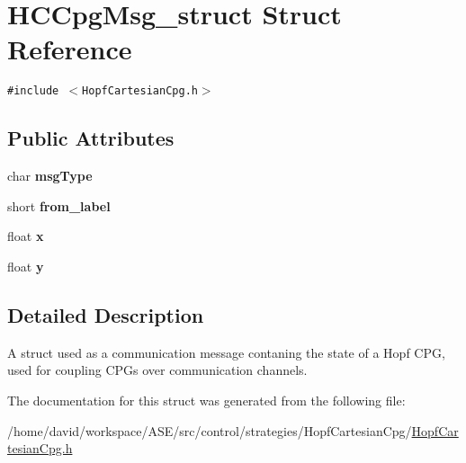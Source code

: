 \hypertarget{structHCCpgMsg__struct}{
\section{HCCpgMsg\_\-struct Struct Reference}
\label{structHCCpgMsg__struct}
}
{\tt \#include $<$HopfCartesianCpg.h$>$}

\subsection*{Public Attributes}
\begin{CompactItemize}
\item 
\hypertarget{structHCCpgMsg__struct_51ae8fe77943bd89e30f8169c91bbd1a}{
char \textbf{msgType}}
\label{structHCCpgMsg__struct_51ae8fe77943bd89e30f8169c91bbd1a}

\item 
\hypertarget{structHCCpgMsg__struct_59ed63ca476804a29cf35401b9ea1a55}{
short \textbf{from\_\-label}}
\label{structHCCpgMsg__struct_59ed63ca476804a29cf35401b9ea1a55}

\item 
\hypertarget{structHCCpgMsg__struct_ce82c8b7317ceb93373a8462719141f4}{
float \textbf{x}}
\label{structHCCpgMsg__struct_ce82c8b7317ceb93373a8462719141f4}

\item 
\hypertarget{structHCCpgMsg__struct_7acee4e2ce2f4b38ef8121772a5461df}{
float \textbf{y}}
\label{structHCCpgMsg__struct_7acee4e2ce2f4b38ef8121772a5461df}

\end{CompactItemize}


\subsection{Detailed Description}
A struct used as a communication message contaning the state of a Hopf CPG, used for coupling CPGs over communication channels. 

The documentation for this struct was generated from the following file:\begin{CompactItemize}
\item 
/home/david/workspace/ASE/src/control/strategies/HopfCartesianCpg/\hyperlink{HopfCartesianCpg_8h}{HopfCartesianCpg.h}\end{CompactItemize}
